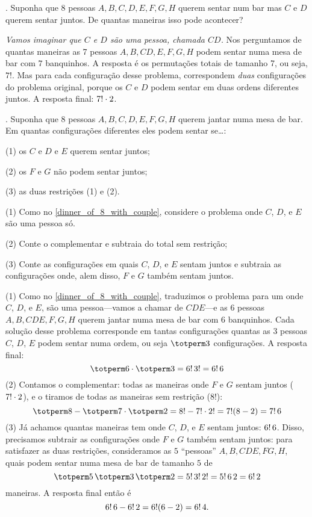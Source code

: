 \example.
\label{dinner_of_8_with_couple}
Suponha que $8$ pessoas $A,B,C,D,E,F,G,H$ querem sentar num bar
mas $C$ e $D$ querem sentar juntos.
De quantas maneiras isso pode acontecer?

\solution
\emph{Vamos imaginar que $C$ e $D$ são uma pessoa, chamada $CD$.}
Nos perguntamos de quantas maneiras as 7 pessoas $A,B,CD,E,F,G,H$ podem sentar
numa mesa de bar com $7$ banquinhos.
A resposta é os permutações totais de tamanho 7, ou seja, $7!$.
Mas para cada configuração desse problema,
correspondem \emph{duas} configurações do problema original, porque os
$C$ e $D$ podem sentar em duas ordens diferentes juntos.
A resposta final:
$7! \mathbin{\cdot} 2$.
\endexample

\exercise.
Suponha que 8 pessoas $A,B,C,D,E,F,G,H$ querem jantar numa mesa de bar.
Em quantas configurações diferentes eles podem sentar se\dots:
\item{(1)} os $C$ e $D$ e $E$ querem sentar juntos;
\item{(2)} os $F$ e $G$ não podem sentar juntos;
\item{(3)} as duas restrições (1) e (2).

\hint
\item{(1)} Como no \ref{dinner_of_8_with_couple},
           considere o problema onde $C$, $D$, e $E$ são uma pessoa só.
\item{(2)} Conte o complementar e subtraia do total sem restrição;
\item{(3)} Conte as configurações em quais $C$, $D$, e $E$ sentam juntos e subtraia
           as configurações onde, alem disso, $F$ e $G$ também sentam juntos.

\solution
(1) Como no \ref{dinner_of_8_with_couple}, traduzimos o problema para um onde
$C$, $D$, e $E$, são uma pessoa---vamos a chamar de $CDE$---e as
$6$ pessoas $A,B,CDE,F,G,H$ querem jantar numa mesa de bar com 6 banquinhos.
Cada solução desse problema corresponde em tantas configurações quantas as $3$ pessoas
$C$, $D$, $E$ podem sentar numa ordem, ou seja $\totperm 3$ configurações.
A resposta final:
$$
\totperm 6 \ntimes \totperm 3 = 6!\stimes3! = 6!\stimes 6
$$
\endgraf
(2) Contamos o complementar:
todas as maneiras onde $F$ e $G$ sentam juntos ($7!\mathbin{\cdot} 2$),
e o tiramos de todas as maneiras sem restrição ($8!$):
$$
\totperm 8 - \totperm 7 \ntimes \totperm 2
= 8! - 7!\ntimes 2! = 7!(8 - 2)
= 7!\stimes 6
$$
(3) Já achamos quantas maneiras tem onde $C$, $D$, e $E$ sentam juntos: $6!\,6$.
Disso, precisamos subtrair as configurações onde $F$ e $G$ também sentam juntos:
para satisfazer as duas restrições, consideramos as $5$ ``pessoas''
$A,B,CDE,FG,H$, quais podem sentar numa mesa de bar de tamanho $5$ de
$$
\totperm 5 \stimes \totperm 3 \stimes \totperm 2
= 5! \stimes 3! \stimes 2!
= 5! \stimes 6 \stimes 2
= 6! \stimes 2
$$
maneiras.
A resposta final então é
$$
6!\,6 - 6!\,2 = 6!(6-2) = 6! \, 4.
$$

